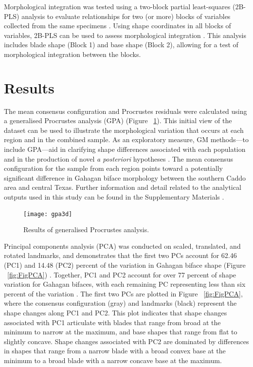 \documentclass[review]{elsarticle}
\begin{document}
Morphological integration was tested using a two-block partial least-squares (2B-PLS) analysis to evaluate relationships for two (or more) blocks of variables collected from the same specimens \citep{RN11615,RN11613,RN11614}. Using shape coordinates in all blocks of variables, 2B-PLS can be used to assess morphological integration \citep{RN11616,RN11615,RN11617}. This analysis includes blade shape (Block 1) and base shape (Block 2), allowing for a test of morphological integration between the blocks.

\section*{Results}

The mean consensus configuration and Procrustes residuals were calculated using a generalised Procrustes analysis (GPA) \citep[Figure 3]{RN1720} (Figure ~\ref{fig:FigGPA}). This initial view of the dataset can be used to illustrate the morphological variation that occurs at each region and in the combined sample. As an exploratory measure, GM methods---to include GPA---aid in clarifying shape differences associated with each population and in the production of novel \textit{a posteriori} hypotheses \citep{RN1720}. The mean consensus configuration for the sample from each region points toward a potentially significant difference in Gahagan biface morphology between the southern Caddo area and central Texas. Further information and detail related to the analytical outputs used in this study can be found in the Supplementary Materials \citep{RN20850}.

\begin{figure}[h]\centering
\texttt{[image: gpa3d]}
\caption{Results of generalised Procrustes analysis.}
\label{fig:FigGPA}
\end{figure}

Principal components analysis (PCA) was conducted on scaled, translated, and rotated landmarks, and demonstrates that the first two PCs account for 62.46 (PC1) and 14.48 (PC2) percent of the variation in Gahagan biface shape (Figure ~\ref{fig:FigPCA}) \citep{RN20850}. Together, PC1 and PC2 account for over 77 percent of shape variation for Gahagan bifaces, with each remaining PC representing less than six percent of the variation \citep{RN20850}. The first two PCs are plotted in Figure ~\ref{fig:FigPCA}, where the consensus configuration (gray) and landmarks (black) represent the shape changes along PC1 and PC2. This plot indicates that shape changes associated with PC1 articulate with blades that range from broad at the minimum to narrow at the maximum, and base shapes that range from flat to slightly concave. Shape changes associated with PC2 are dominated by differences in shapes that range from a narrow blade with a broad convex base at the minimum to a broad blade with a narrow concave base at the maximum.
\end{document}
